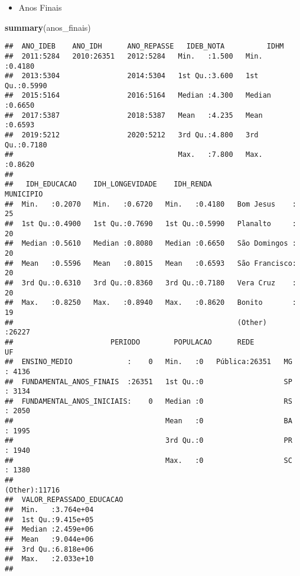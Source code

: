 \documentclass[
]{article}
\newenvironment{Shaded}{\begin{snugshade}}{\end{snugshade}}
\newcommand{\KeywordTok}[1]{\textcolor[rgb]{0.13,0.29,0.53}{\textbf{#1}}}
\newcommand{\NormalTok}[1]{#1}
\providecommand{\tightlist}{%
  \setlength{\itemsep}{0pt}\setlength{\parskip}{0pt}}
\begin{document}
\begin{itemize}
\tightlist
\item
  Anos Finais
\end{itemize}

\begin{Shaded}
\begin{Highlighting}[]
\KeywordTok{summary}\NormalTok{(anos\_finais)}
\end{Highlighting}
\end{Shaded}

\begin{verbatim}
##  ANO_IDEB    ANO_IDH      ANO_REPASSE   IDEB_NOTA          IDHM       
##  2011:5284   2010:26351   2012:5284   Min.   :1.500   Min.   :0.4180  
##  2013:5304                2014:5304   1st Qu.:3.600   1st Qu.:0.5990  
##  2015:5164                2016:5164   Median :4.300   Median :0.6650  
##  2017:5387                2018:5387   Mean   :4.235   Mean   :0.6593  
##  2019:5212                2020:5212   3rd Qu.:4.800   3rd Qu.:0.7180  
##                                       Max.   :7.800   Max.   :0.8620  
##                                                                       
##   IDH_EDUCACAO    IDH_LONGEVIDADE    IDH_RENDA              MUNICIPIO    
##  Min.   :0.2070   Min.   :0.6720   Min.   :0.4180   Bom Jesus    :   25  
##  1st Qu.:0.4900   1st Qu.:0.7690   1st Qu.:0.5990   Planalto     :   20  
##  Median :0.5610   Median :0.8080   Median :0.6650   São Domingos :   20  
##  Mean   :0.5596   Mean   :0.8015   Mean   :0.6593   São Francisco:   20  
##  3rd Qu.:0.6310   3rd Qu.:0.8360   3rd Qu.:0.7180   Vera Cruz    :   20  
##  Max.   :0.8250   Max.   :0.8940   Max.   :0.8620   Bonito       :   19  
##                                                     (Other)      :26227  
##                       PERIODO        POPULACAO      REDE             UF       
##  ENSINO_MEDIO             :    0   Min.   :0   Pública:26351   MG     : 4136  
##  FUNDAMENTAL_ANOS_FINAIS  :26351   1st Qu.:0                   SP     : 3134  
##  FUNDAMENTAL_ANOS_INICIAIS:    0   Median :0                   RS     : 2050  
##                                    Mean   :0                   BA     : 1995  
##                                    3rd Qu.:0                   PR     : 1940  
##                                    Max.   :0                   SC     : 1380  
##                                                                (Other):11716  
##  VALOR_REPASSADO_EDUCACAO
##  Min.   :3.764e+04       
##  1st Qu.:9.415e+05       
##  Median :2.459e+06       
##  Mean   :9.044e+06       
##  3rd Qu.:6.818e+06       
##  Max.   :2.033e+10       
## 
\end{verbatim}
\end{document}
